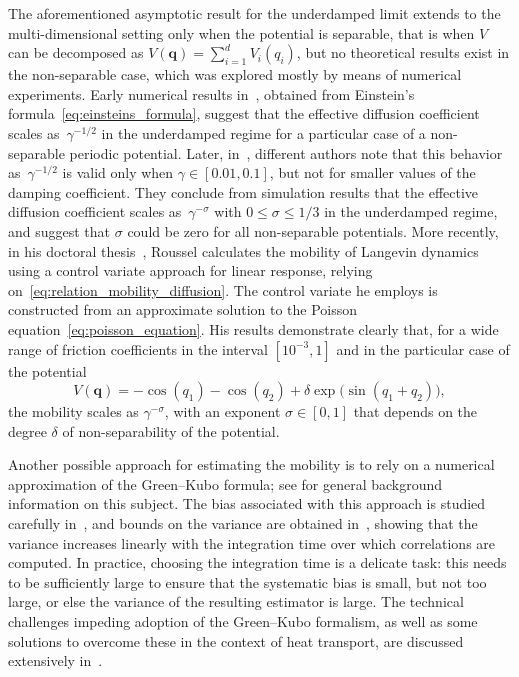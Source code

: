 \documentclass[11pt,a4paper]{article}
\newcommand{\vect}[1]{\boldsymbol{\mathbf #1}}
\theoremstyle{plain}
\numberwithin{equation}{section}
\renewcommand{\leq}{\leqslant}
\begin{document}
The aforementioned asymptotic result for the underdamped limit extends to the multi-dimensional setting only when the potential is separable,
that is when $V$ can be decomposed as $V(\vect q) = \sum_{i=1}^d V_i(q_i)$,
but no theoretical results exist in the non-separable case,
which was explored mostly by means of numerical experiments.
Early numerical results in~\cite{chen1996surface}, obtained from Einstein's formula~\eqref{eq:einsteins_formula},
suggest that the effective diffusion coefficient scales as~$\gamma^{-1/2}$ in the underdamped regime for a particular case of a non-separable periodic potential.
Later, in~\cite{Braun02},
different authors note that this behavior as~$\gamma^{-1/2}$ is valid only when $\gamma \in [0.01, 0.1]$,
but not for smaller values of the damping coefficient.
They conclude from simulation results that the effective diffusion coefficient scales as~$\gamma^{-\sigma}$ with $0 \leq \sigma \leq 1/3$ in the underdamped regime,
and suggest that $\sigma$ could be zero for all non-separable potentials.
More recently, in his doctoral thesis~\cite{roussel_thesis},
Roussel calculates the mobility of Langevin dynamics using a control variate approach for linear response,
relying on~\eqref{eq:relation_mobility_diffusion}.
The control variate he employs is constructed from an approximate solution to the Poisson equation~\eqref{eq:poisson_equation}.
His results demonstrate clearly that, for a wide range of friction coefficients in the interval $[10^{-3}, 1]$
and in the particular case of the potential
\begin{equation}
    \label{eq:potential_julien}
    V(\vect q) = - \cos(q_1) - \cos(q_2) + \delta \exp \bigl(\sin(q_1 + q_2)\bigr),
\end{equation}
the mobility scales as $\gamma^{- \sigma}$,
with an exponent $\sigma \in [0, 1]$ that depends on the degree $\delta$ of non-separability of the potential.

Another possible approach for estimating the mobility is to rely on a numerical approximation of the Green--Kubo formula;
see \cite[Section 5.1.3]{MR3509213} for general background information on this subject.
The bias associated with this approach is studied carefully in~\cite{LMS16},
and bounds on the variance are obtained in~\cite{PSW21},
showing that the variance increases linearly with the integration time over which correlations are computed.
In practice, choosing the integration time is a delicate task:
this needs to be sufficiently large to ensure that the systematic bias is small,
but not too large, or else the variance of the resulting estimator is large.
The technical challenges impeding adoption of the Green--Kubo formalism,
as well as some solutions to overcome these in the context of heat transport,
are discussed extensively in~\cite{ercole2017accurate,2018arXiv180208006B}.
\end{document}
